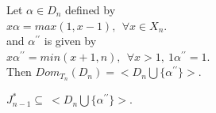 \documentclass[10pt,a4paper]{amsart}
\begin{document}
\begin{proposition} \label{ndn}
Let $\alpha \in D_n$ defined by \\ 
\vspace{0.1cm}
\hspace{6cm} $x\alpha=max(1,x-1), \ \ \forall x\in X_n.$\\
and $\alpha^{\prime\prime}$ is given by\\
\vspace{0.1cm}
\hspace{6cm} $x\alpha^{\prime\prime}=min(x+1,n), \ \ \forall x>1, \ 1\alpha^{\prime\prime}=1$.\\ 
Then $Dom_{T_n}(D_n)=<D_n \bigcup \{{\alpha^{\prime\prime}}\}>$.
\end{proposition}

\begin{lemma}
  $J^*_{n-1}\subseteq \ <D_n \bigcup \{\alpha^{\prime\prime}\}>$.
\end{lemma}
\end{document}
